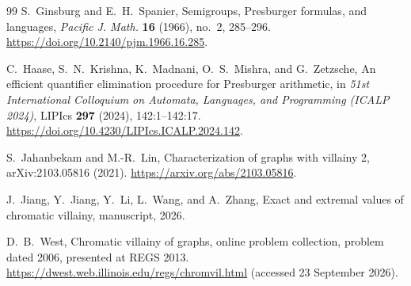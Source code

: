 \documentclass[11pt,reqno]{amsart}
\numberwithin{equation}{section}
\theoremstyle{definition}
\theoremstyle{remark}
\begin{document}
\begin{thebibliography}{99}
S.~Ginsburg and E.~H.~Spanier,
Semigroups, Presburger formulas, and languages,
\emph{Pacific J. Math.} \textbf{16} (1966), no.~2, 285--296.
\url{https://doi.org/10.2140/pjm.1966.16.285}.

C.~Haase, S.~N.~Krishna, K.~Madnani, O.~S.~Mishra, and G.~Zetzsche,
An efficient quantifier elimination procedure for Presburger arithmetic,
in \emph{51st International Colloquium on Automata, Languages, and
Programming (ICALP 2024)}, LIPIcs \textbf{297} (2024), 142:1--142:17.
\url{https://doi.org/10.4230/LIPIcs.ICALP.2024.142}.

S.~Jahanbekam and M.-R.~Lin,
Characterization of graphs with villainy 2,
arXiv:2103.05816 (2021).
\url{https://arxiv.org/abs/2103.05816}.

J.~Jiang, Y.~Jiang, Y.~Li, L.~Wang, and A.~Zhang,
Exact and extremal values of chromatic villainy,
manuscript, 2026.

D.~B.~West,
Chromatic villainy of graphs,
online problem collection, problem dated 2006, presented at REGS 2013.
\url{https://dwest.web.illinois.edu/regs/chromvil.html}
(accessed 23 September 2026).

\end{thebibliography}
\end{document}
